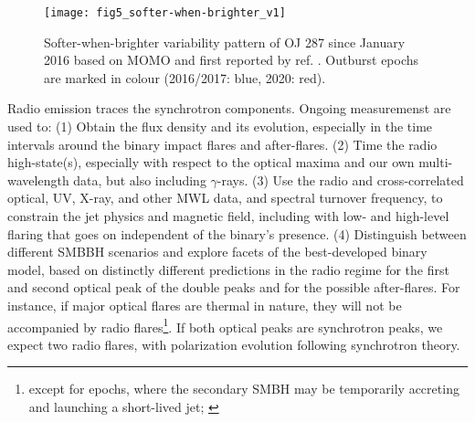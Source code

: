 \documentclass[preprints,article,accept,moreauthors,pdftex]{Definitions/mdpi}
\begin{document}
\begin{figure}
\begin{center}
%
\texttt{[image: fig5\_softer-when-brighter\_v1]}
	\caption{Softer-when-brighter variability pattern of OJ 287 since January 2016 based on MOMO and first reported by ref. \citep{Komossa2017}. Outburst epochs are marked in colour (2016/2017: blue, 2020: red). 
     }
     \label{fig:softer-when-brighter}
\end{center}
\end{figure}

Radio emission traces the synchrotron components.
Ongoing measuremenst are used to: (1) Obtain the flux density and its evolution, especially  in the  time intervals around the binary impact flares and after-flares. (2) Time the radio high-state(s), especially with respect to the optical maxima and our own multi-wavelength data, but also including $\gamma$-rays. 
(3) Use the radio and cross-correlated optical, UV, X-ray, and other MWL data, and spectral turnover frequency, to constrain the jet physics and magnetic field, including with low- and high-level flaring that goes on independent of the binary's presence.  
(4) Distinguish between different SMBBH scenarios and explore facets of the best-developed binary model, based on distinctly different predictions in the radio regime for the first and second optical peak of the double peaks and for the possible after-flares.   
For instance, if major optical flares 
are thermal in nature, they will not be accompanied by radio flares{\footnote{except for epochs, where the secondary SMBH may be temporarily accreting and launching a short-lived jet; \citep{Pihajoki2013, Dey2021}}}. If both optical peaks are synchrotron peaks, we expect two radio flares, with polarization evolution following synchrotron theory.  
\end{document}
